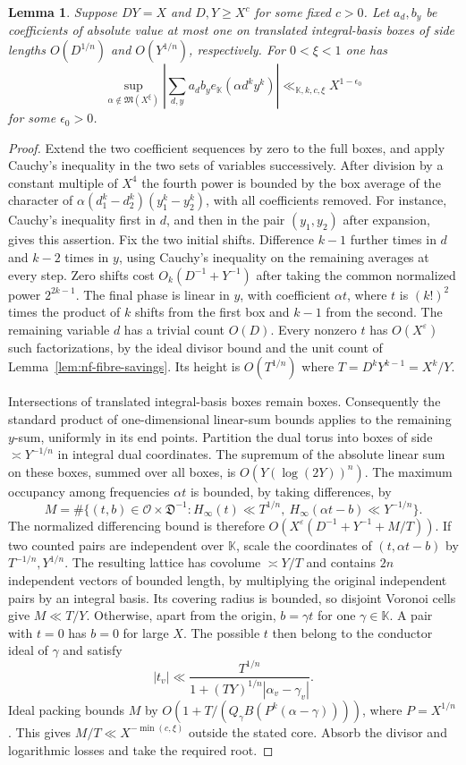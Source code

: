 \documentclass[11pt,letterpaper]{article}
\newtheorem{lemma}[lemma]{Lemma}
\theoremstyle{definition}
\numberwithin{equation}{section}
\begin{document}
\begin{lemma}\label{lem:nf-bilinear-weyl}
Suppose $D Y=X$ and $D,Y\ge X^c$ for some fixed $c>0$. Let
$a_d,b_y$ be coefficients of absolute value at most one on translated
integral-basis boxes of side lengths $O(D^{1/n})$ and $O(Y^{1/n})$,
respectively. For $0<\xi<1$ one has
\[
 \sup_{\alpha\notin\mathfrak M(X^\xi)}
 \left|\sum_{d,y}a_db_y e_{\mathbb K}(\alpha d^k y^k)\right|
              \ll_{\mathbb K,k,c,\xi}X^{1-\epsilon_0}
\]
for some $\epsilon_0>0$.
\end{lemma}
\begin{proof}
Extend the two coefficient sequences by zero to the full boxes, and apply Cauchy's inequality in the two sets of variables successively.
After division by a constant multiple of $X^4$ the fourth power is
bounded by the box average of the character of
$\alpha(d_1^k-d_2^k)(y_1^k-y_2^k)$, with all coefficients removed.
For instance, Cauchy's inequality first in $d$, and then in the pair
$(y_1,y_2)$ after expansion, gives this assertion. Fix the two
initial shifts. Difference $k-1$ further times in $d$ and $k-2$
times in $y$, using Cauchy's inequality on the remaining averages
at every step. Zero shifts cost $O_k(D^{-1}+Y^{-1})$ after taking
the common normalized power $2^{2k-1}$. The final phase is linear
in $y$, with coefficient $\alpha t$, where $t$ is $(k!)^2$ times
the product of $k$ shifts from the first box and $k-1$ from the
second. The remaining variable $d$ has a trivial count $O(D)$.
Every nonzero $t$ has $O(X^\varepsilon)$ such factorizations,
by the ideal divisor bound and the unit count of
Lemma~\ref{lem:nf-fibre-savings}. Its height is $O(T^{1/n})$
where $T=D^kY^{k-1}=X^k/Y$.

Intersections of translated integral-basis boxes remain boxes.
Consequently the standard product of one-dimensional linear-sum
bounds applies to the remaining $y$-sum, uniformly in its end
points. Partition the dual torus into boxes of side $\asymp Y^{-1/n}$
in integral dual coordinates. The supremum of the absolute linear
sum on these boxes, summed over all boxes, is
$O(Y(\log(2Y))^n)$. The maximum occupancy among frequencies
$\alpha t$ is bounded, by taking differences, by
\[
 M=\#\{(t,b)\in\mathcal O\times\mathfrak D^{-1}:
  H_\infty(t)\ll T^{1/n},\ 
  H_\infty(\alpha t-b)\ll Y^{-1/n}\}.
\]
The normalized differencing bound is therefore
$O(X^\varepsilon(D^{-1}+Y^{-1}+M/T))$.
If two counted pairs are independent over $\mathbb K$, scale the
coordinates of $(t,\alpha t-b)$ by $T^{-1/n},Y^{1/n}$.
The resulting lattice has covolume $\asymp Y/T$ and contains
$2n$ independent vectors of bounded length, by multiplying the
original independent pairs by an integral basis. Its covering
radius is bounded, so disjoint Voronoi cells give $M\ll T/Y$.
Otherwise, apart from the origin, $b=\gamma t$ for one
$\gamma\in\mathbb K$. A pair with $t=0$ has $b=0$ for large $X$.
The possible $t$ then belong to the conductor ideal of $\gamma$
and satisfy
\[
 |t_v|\ll
 \frac{T^{1/n}}{1+(T Y)^{1/n}|\alpha_v-\gamma_v|}.
\]
Ideal packing bounds $M$ by $O(1+T/(Q_\gamma
B(P^k(\alpha-\gamma))))$, where $P=X^{1/n}$.
This gives $M/T\ll X^{-\min(c,\xi)}$ outside the stated core.
Absorb the divisor and logarithmic losses and take the required root.
\end{proof}
\end{document}
